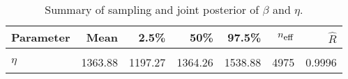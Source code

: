 \begin{table}
\centering
\caption{\label{tab:idler-frame-posterior-summary}Summary of sampling and joint posterior of $\beta$ and $\eta$.}
\centering
\begin{tabular}[t]{lrrrrrr}
\toprule
Parameter & Mean & 2.5\% & 50\% & 97.5\% & $n_{\small{\mbox{eff}}}$ & $\hat{R}$\\
\midrule
\cellcolor{gray!10}{$\beta$} & \cellcolor{gray!10}{1.10} & \cellcolor{gray!10}{1.00} & \cellcolor{gray!10}{1.10} & \cellcolor{gray!10}{1.20} & \cellcolor{gray!10}{6641} & \cellcolor{gray!10}{0.9996}\\
$\eta$ & 1363.88 & 1197.27 & 1364.26 & 1538.88 & 4975 & 0.9996\\
\bottomrule
\end{tabular}
\end{table}
